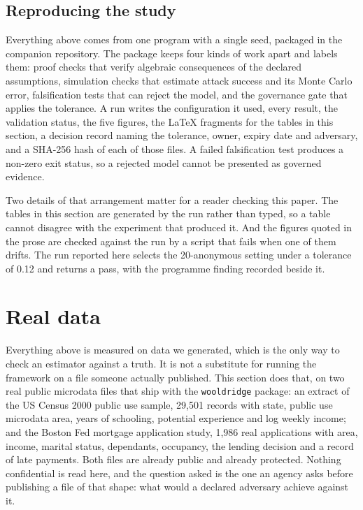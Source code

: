 \documentclass[11pt,a4paper]{article}
\theoremstyle{plain}
\theoremstyle{definition}
\begin{document}
\subsection{Reproducing the study}\label{sec:repro}

Everything above comes from one program with a single seed, packaged in the
companion repository. The package keeps four kinds of work apart and labels
them: proof checks that verify algebraic consequences of the declared
assumptions, simulation checks that estimate attack success and its Monte Carlo
error, falsification tests that can reject the model, and the governance gate
that applies the tolerance. A run writes the configuration it used, every
result, the validation status, the five figures, the LaTeX fragments for the
tables in this section, a decision record naming the tolerance, owner, expiry
date and adversary, and a SHA-256 hash of each of those files. A failed
falsification test produces a non-zero exit status, so a rejected model cannot
be presented as governed evidence.

Two details of that arrangement matter for a reader checking this paper. The
tables in this section are generated by the run rather than typed, so a table
cannot disagree with the experiment that produced it. And the figures quoted in
the prose are checked against the run by a script that fails when one of them
drifts. The run reported here selects the 20-anonymous setting under a tolerance
of 0.12 and returns a pass, with the programme finding recorded beside it.

\section{Real data}\label{sec:real}

Everything above is measured on data we generated, which is the only way to check
an estimator against a truth. It is not a substitute for running the framework on
a file someone actually published. This section does that, on two real public
microdata files that ship with the \texttt{wooldridge} package: an extract of the
US Census 2000 public use sample, 29,501 records with state, public use microdata
area, years of schooling, potential experience and log weekly income; and the
Boston Fed mortgage application study, 1,986 real applications with area, income,
marital status, dependants, occupancy, the lending decision and a record of late
payments. Both files are already public and already protected. Nothing
confidential is read here, and the question asked is the one an agency asks before
publishing a file of that shape: what would a declared adversary achieve against
it.
\end{document}
